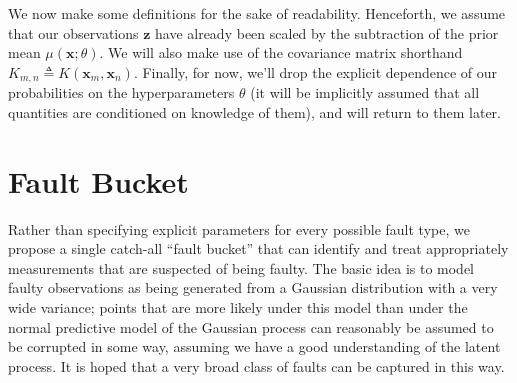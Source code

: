 \documentclass{article}
\newcommand{\psff}[1]{\texttt{[image: \#1.eps]}}
\newcommand{\bm}[1]{\ensuremath{\mathbf{#1}}}
\newcommand{\vect}[1]{\bm{#1}}
\newcommand{\vz}{\vect{z}}
\newcommand{\vx}{\vect{x}}
\newcommand{\defequal}{\triangleq}
\begin{document}
We now make some definitions for the sake of readability. Henceforth, we assume that our observations $\vz$ have already been scaled by the subtraction of the prior mean $\mu(\bm{x}; \theta)$. We will also make use of the covariance matrix shorthand $K_{m,n} \defequal K(\vx_m,\vx_n)$. Finally, for now, we'll drop the explicit dependence of our probabilities on the hyperparameters $\theta$ (it will be implicitly assumed that all quantities are conditioned on knowledge of them), and will return to them later.



\section{Fault Bucket}
Rather than specifying explicit parameters for every possible fault
type, we propose a single catch-all ``fault
bucket'' that can identify and treat appropriately measurements that
are suspected of being faulty.  The basic idea is to model faulty
observations as being generated from a Gaussian distribution with a
very wide variance; points that are more likely under this model than
under the normal predictive model of the Gaussian process can
reasonably be assumed to be corrupted in some way, assuming we have a
good understanding of the latent process. It is hoped that a very broad class of faults can be captured in this way.
\end{document}
